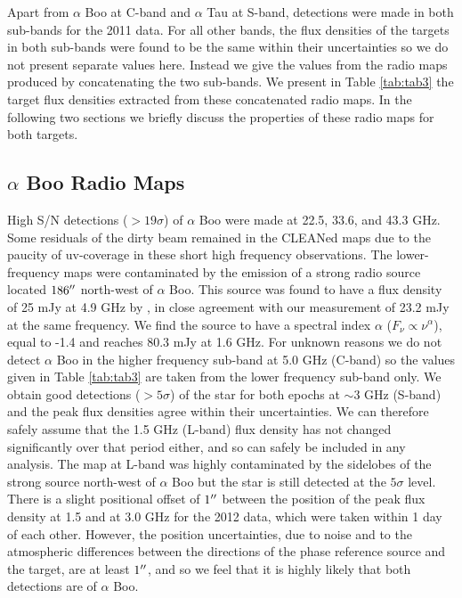 \documentclass[iop]{emulateapj}
\begin{document}
Apart from $\alpha$ Boo at C-band and $\alpha$ Tau at S-band, detections were made in both sub-bands for the 2011 data. For all other bands, the flux densities of the targets in both sub-bands were found to be the same within their uncertainties so we do not present separate values here. Instead we give the values from the radio maps produced by concatenating the two sub-bands. We present in Table \ref{tab:tab3} the target flux densities extracted from these concatenated radio maps. In the following two sections we briefly discuss the properties of these radio maps for both targets.

\subsection{$\alpha$ Boo Radio Maps} \label{results1} 
High S/N detections ($>19\sigma$) of $\alpha$ Boo were made at 22.5, 33.6, and 43.3 GHz. Some residuals of the dirty beam remained in the CLEANed maps due to the paucity of uv-coverage in these short high frequency observations. The lower-frequency maps were contaminated by the emission of a strong radio source located $186\mbox{$^{\prime\prime}$}$ north-west of $\alpha$ Boo. This source was found to have a flux density of 25 mJy at 4.9 GHz by \cite{1986AJ.....91..602D}, in close agreement with our measurement of 23.2 mJy at the same frequency. We find the source to have a spectral index $\alpha$ ($F_{\nu} \propto \nu ^{\alpha}$), equal to -1.4 and reaches 80.3 mJy at 1.6 GHz. For unknown reasons we do not detect $\alpha$ Boo in the higher frequency sub-band at 5.0 GHz (C-band) so the values given in Table \ref{tab:tab3} are taken from the lower frequency sub-band only. We obtain good detections ($>5\sigma$) of the star for both epochs at $\sim$3 GHz (S-band) and the peak flux densities agree within their uncertainties. We can therefore safely assume that the 1.5 GHz (L-band) flux density has not changed significantly over that period either, and so can safely be included in any analysis. The map at L-band was highly contaminated by the sidelobes of the strong source north-west of $\alpha$ Boo but the star is still detected at the $5\sigma$ level. There is a slight positional offset of $1\mbox{$^{\prime\prime}$}$ between the position of the peak flux density at 1.5 and at 3.0 GHz for the 2012 data, which were taken within 1 day of each other. However, the position uncertainties, due to noise and to the atmospheric differences between the directions of the phase reference source and the target, are at least $1\mbox{$^{\prime\prime}$}$, and so we feel that it is highly likely that both detections are of $\alpha$ Boo. 
\end{document}
